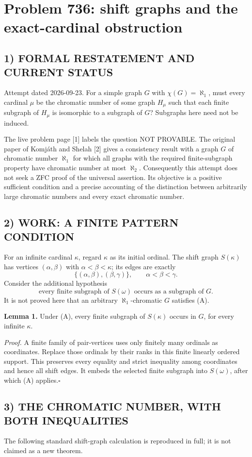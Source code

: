 \section{Problem 736: shift graphs and the exact-cardinal obstruction}
\subsection*{1) FORMAL RESTATEMENT AND CURRENT STATUS}
Attempt dated 2026-09-23. For a simple graph $G$ with $\chi(G)=\aleph_1$, must every cardinal $\mu$ be the chromatic number of some graph $H_\mu$ such that each finite subgraph of $H_\mu$ is isomorphic to a subgraph of $G$? Subgraphs here need not be induced.

The live problem page [1] labels the question NOT PROVABLE. The original paper of Komj\'ath and Shelah [2] gives a consistency result with a graph $G$ of chromatic number $\aleph_1$ for which all graphs with the required finite-subgraph property have chromatic number at most $\aleph_2$. Consequently this attempt does not seek a ZFC proof of the universal assertion. Its objective is a positive sufficient condition and a precise accounting of the distinction between arbitrarily large chromatic numbers and every exact chromatic number.

\subsection*{2) WORK: A FINITE PATTERN CONDITION}
For an infinite cardinal $\kappa$, regard $\kappa$ as its initial ordinal. The shift graph $S(\kappa)$ has vertices $(\alpha,\beta)$ with $\alpha<\beta<\kappa$; its edges are exactly
\[
\{(\alpha,\beta),(\beta,\gamma)\},\qquad \alpha<\beta<\gamma.
\]
Consider the additional hypothesis
\[
\text{every finite subgraph of }S(\omega)\text{ occurs as a subgraph of }G.\tag{A}
\]
It is not proved here that an arbitrary $\aleph_1$-chromatic $G$ satisfies (A).

\textbf{Lemma 1.} Under (A), every finite subgraph of $S(\kappa)$ occurs in $G$, for every infinite $\kappa$.

\emph{Proof.} A finite family of pair-vertices uses only finitely many ordinals as coordinates. Replace those ordinals by their ranks in this finite linearly ordered support. This preserves every equality and strict inequality among coordinates and hence all shift edges. It embeds the selected finite subgraph into $S(\omega)$, after which (A) applies.\hfill$\square$

\subsection*{3) THE CHROMATIC NUMBER, WITH BOTH INEQUALITIES}
The following standard shift-graph calculation is reproduced in full; it is not claimed as a new theorem.


